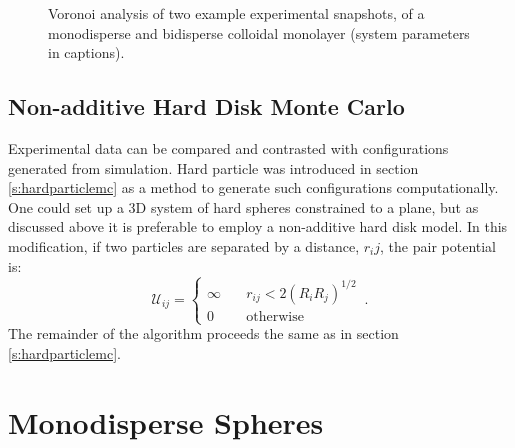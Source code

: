\begin{figure}[bt]
     \caption{Voronoi analysis of two example experimental snapshots, of a monodisperse and bidisperse \qtd{} colloidal monolayer (system parameters in captions).}
     \label{fig:expvoro}
\end{figure}

\subsection{Non\--additive Hard Disk Monte Carlo}

Experimental data can be compared and contrasted with configurations generated from simulation.
Hard particle \mc{} was introduced in section \ref{s:hardparticlemc} as a method to generate such configurations computationally.
One could set up a 3D system of hard spheres constrained to a plane, but as discussed above it is preferable to employ a non\--additive hard disk model.
In this modification, if two particles are separated by a distance, $r_ij$, the pair potential is:
\begin{equation}
	\mathcal{U}_{ij} = \begin{cases} \infty \quad &r_{ij}<2\left(R_iR_j\right)^{1/2} \\ 0 \quad &\text{otherwise} \end{cases}\,.
\end{equation}
The remainder of the algorithm proceeds the same as in section \ref{s:hardparticlemc}.


\section{Monodisperse Spheres}


